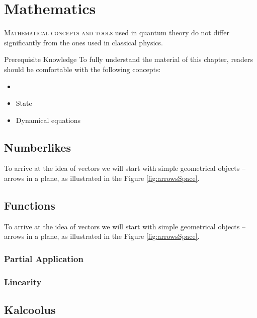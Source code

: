 \graphicspath{{../03Mathematics/pics/}}

\chapter{Mathematics}\label{ch:Mathematics}

\lettrine[lines=2]{\color{darkocre}M}{athematical concepts and tools} used in quantum theory do not differ significantly from the ones used in classical physics.

\begin{myprereq}{Prerequisite Knowledge}
	To fully understand the material of this chapter, readers should be comfortable with the following concepts:
	
	\begin{itemize}
		\item \phantom{phantom}
		\vspace{-0.5cm}
		\item State
		\item Dynamical equations
	\end{itemize}	
\end{myprereq}

\section{Numberlikes}

To arrive at the idea of vectors we will start with simple geometrical
objects -- arrows in a plane, as illustrated in the Figure \ref{fig:arrowsSpace}.


\section{Functions}

To arrive at the idea of vectors we will start with simple geometrical
objects -- arrows in a plane, as illustrated in the Figure \ref{fig:arrowsSpace}.

\subsection{Partial Application}

\subsection{Linearity}

\section{Kalcoolus}

